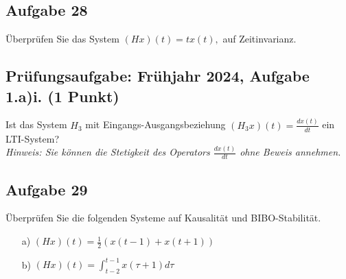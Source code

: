 \documentclass[11pt]{article}
\begin{document}
\subsection*{Aufgabe 28}
\vspace*{-0.5cm}
Überprüfen Sie das System
$(Hx)(t) = tx(t),$
auf Zeitinvarianz.

\vspace*{-0.2cm}

\subsection*{Prüfungsaufgabe: Frühjahr 2024, Aufgabe 1.a)i. (1 Punkt)}
\vspace*{-0.5cm}
Ist das System $H_3$ mit Eingangs-Ausgangsbeziehung $(H_3 x)(t) = \frac{dx(t)}{dt}$ ein LTI-System? \\
\textit{Hinweis: Sie können die Stetigkeit des Operators $\frac{dx(t)}{dt}$ ohne Beweis annehmen.}

\vspace*{-0.25cm}

\pagebreak

\subsection*{Aufgabe 29}
\vspace*{-0.5cm}
Überprüfen Sie die folgenden Systeme auf Kausalität und BIBO-Stabilität.
\begin{multicols}{2}
    \begin{itemize}
        \item[a)] $(Hx)(t) = \displaystyle \frac{1}{2}(x(t-1) + x(t+1))$
        \item[b)] $(Hx)(t) = \displaystyle \int_{t-2}^{t-1} x(\tau + 1)d\tau$
    \end{itemize}
\end{multicols}

\vspace*{-0.5cm}
\end{document}
